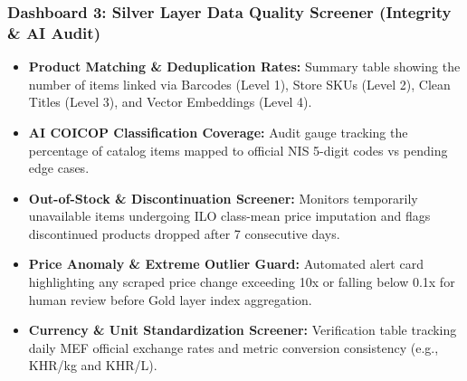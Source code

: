 \documentclass[10pt,a4paper]{article}
\begin{document}
\subsubsection*{Dashboard 3: Silver Layer Data Quality Screener (Integrity \& AI Audit)}
\begin{itemize}[noitemsep,topsep=1pt,leftmargin=*]
    \item \textbf{Product Matching \& Deduplication Rates:} Summary table showing the number of items linked via Barcodes (Level 1), Store SKUs (Level 2), Clean Titles (Level 3), and Vector Embeddings (Level 4).
    \item \textbf{AI COICOP Classification Coverage:} Audit gauge tracking the percentage of catalog items mapped to official NIS 5-digit codes vs pending edge cases.
    \item \textbf{Out-of-Stock \& Discontinuation Screener:} Monitors temporarily unavailable items undergoing ILO class-mean price imputation and flags discontinued products dropped after 7 consecutive days.
    \item \textbf{Price Anomaly \& Extreme Outlier Guard:} Automated alert card highlighting any scraped price change exceeding 10x or falling below 0.1x for human review before Gold layer index aggregation.
    \item \textbf{Currency \& Unit Standardization Screener:} Verification table tracking daily MEF official exchange rates and metric conversion consistency (e.g., KHR/kg and KHR/L).
\end{itemize}
\end{document}
